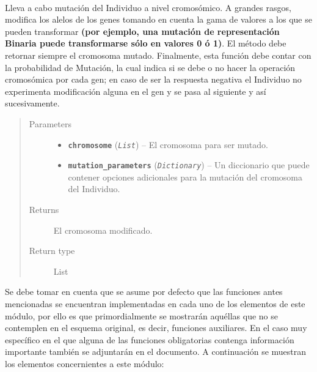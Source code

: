 \documentclass[class=report, crop=false]{standalone}
\begin{document}
\begin{fulllineitems}

~
\vspace{-0.1cm}

Lleva a cabo mutación del Individuo a nivel cromosómico.\break
A grandes rasgos, modifica los alelos de los genes tomando 
en cuenta la gama de valores a los que se pueden transformar 
\textbf{(por ejemplo, una mutación de representación Binaria puede transformarse sólo en valores 0 ó 1)}.\medskip\break
El método debe retornar siempre el cromosoma mutado.\break
Finalmente, esta función debe contar con la probabilidad de Mutación,
la cual indica si se debe o no hacer la operación cromosómica 
por cada gen; en caso de ser la respuesta negativa el Individuo 
no experimenta modificación alguna en el gen y se pasa al 
siguiente y así sucesivamente.

\begin{quote}\begin{description}
\item[{Parameters}] \leavevmode\begin{itemize}
\item \textbf{\texttt{chromosome}} (\emph{\texttt{List}}) -- El cromosoma para ser mutado.
\item \textbf{\texttt{mutation\_parameters}} (\emph{\texttt{Dictionary}}) -- Un diccionario que puede contener opciones adicionales para la
mutación del cromosoma del Individuo.
\end{itemize}
\item[{Returns}] \leavevmode
El cromosoma modificado.
\item[{Return type}] \leavevmode
List
\end{description}\end{quote}

\end{fulllineitems}

Se debe tomar en cuenta que se asume por defecto que las funciones antes 
mencionadas se encuentran implementadas en cada uno de los elementos de 
este módulo, por ello es que primordialmente se mostrarán aquéllas que 
no se contemplen en el esquema original, es decir, funciones auxiliares.\break
En el caso muy específico en el que alguna de las funciones obligatorias 
contenga información importante también se adjuntarán en el documento.\medskip\break  
A continuación se muestran los elementos concernientes a este módulo:
\end{document}
